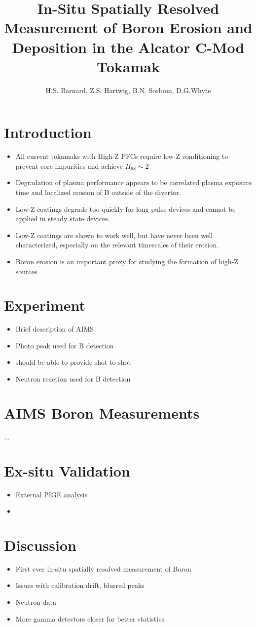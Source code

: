 \documentclass[11pt,a4paper,final]{article}
\author{H.S. Barnard, Z.S. Hartwig, B.N. Sorbom, D.G.Whyte}
\title{In-Situ Spatially Resolved Measurement of Boron Erosion and Deposition in the Alcator C-Mod Tokamak}
\begin{document}
\maketitle
\section{Introduction}
\begin{itemize}
	\item All current tokamaks with High-Z PFCs require low-Z conditioning to prevent core impurities and achieve $H_{98}\sim 2$
	\item Degradation of plasma performance appears to be correlated plasma exposure time and localized erosion of B outside of the divertor.
	\item Low-Z coatings degrade too quickly for long pulse devices and cannot be applied in steady state devices.
	\item Low-Z coatings are shown to work well, but have never been well characterized, especially on the relevant timescales of their erosion.
	\item Boron erosion is an important proxy for studying the formation of high-Z sources 
\end{itemize}

\section{Experiment}
\begin{itemize}
	\item Brief description of AIMS
	\item Photo peak used for B detection
	\item should be able to provide shot to shot 
	\item Neutron reaction used for B detection
\end{itemize}

\section{AIMS Boron Measurements}
...
\section{Ex-situ Validation}
\begin{itemize}
	\item External PIGE analysis
	\item 
\end{itemize}
\section{Discussion}
\begin{itemize}
	\item First ever in-situ spatially resolved measurement of Boron
	\item Issues with calibration drift, blurred peaks
	\item Neutron data
	\item More gamma detectors closer for better statistics
\end{itemize}
\end{document}
